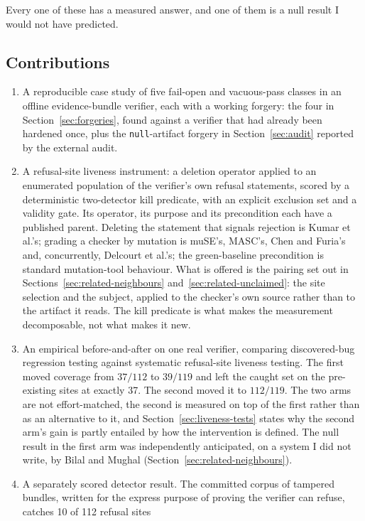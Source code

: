 \documentclass[11pt]{article}
\begin{document}
Every one of these has a measured answer, and one of them is a null result I would not have
predicted.

\subsection*{Contributions}

\begin{enumerate}
\item A reproducible case study of five fail-open and vacuous-pass classes in an offline
evidence-bundle verifier, each with a working forgery: the four in
Section~\ref{sec:forgeries}, found against a verifier that had already been hardened once,
plus the \texttt{null}-artifact forgery in Section~\ref{sec:audit} reported by the external
audit.
\item A refusal-site liveness instrument: a deletion operator applied to an enumerated
population of the verifier's own refusal statements, scored by a deterministic two-detector
kill predicate, with an explicit exclusion set and a validity gate. Its operator, its purpose
and its precondition each have a published parent. Deleting the statement that signals
rejection is Kumar et al.'s; grading a checker by mutation is muSE's, MASC's, Chen and
Furia's and, concurrently, Delcourt et al.'s; the green-baseline precondition is standard
mutation-tool behaviour. What is offered is the pairing set out in
Sections~\ref{sec:related-neighbours} and~\ref{sec:related-unclaimed}: the site selection and
the subject, applied to the checker's own source rather than to the artifact it reads. The
kill predicate is what makes the measurement decomposable, not what makes it new.
\item An empirical before-and-after on one real verifier, comparing discovered-bug
regression testing against systematic refusal-site liveness testing. The first moved
coverage from $37/112$ to $39/119$ and left the caught set on the pre-existing sites at
exactly 37. The second moved it to $112/119$. The two arms are not effort-matched, the
second is measured on top of the first rather than as an alternative to it, and
Section~\ref{sec:liveness-tests} states why the second arm's gain is partly entailed by
how the intervention is defined. The null result in the first arm was independently
anticipated, on a system I did not write, by Bilal and Mughal
(Section~\ref{sec:related-neighbours}).
\item A separately scored detector result. The committed corpus of tampered bundles, written
for the express purpose of proving the verifier can refuse, catches 10 of 112 refusal sites

\end{enumerate}
\end{document}
